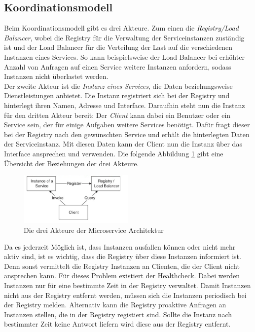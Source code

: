 \subsection{Koordinationsmodell}

Beim Koordinationsmodell gibt es drei Akteure. Zum einen die \textit{Registry/Load Balancer}, wobei die Registry für die Verwaltung der Serviceinstanzen zuständig ist und der Load Balancer für die Verteilung der Last auf die verschiedenen Instanzen eines Services. So kann beispielsweise der Load Balancer bei erhöhter Anzahl von Anfragen auf einen Service weitere Instanzen anfordern, sodass Instanzen nicht überlastet werden.\\
Der zweite Akteur ist die \textit{Instanz eines Services}, die Daten beziehungsweise Dienstleistungen anbietet. Die Instanz registriert sich bei der Registry und hinterlegt ihren Namen, Adresse und Interface. Daraufhin steht nun die Instanz für den dritten Akteur bereit: Der \textit{Client} kann dabei ein Benutzer oder ein Service sein, der für einige Aufgaben weitere Services benötigt. Dafür fragt dieser bei der Registry nach den gewünschten Service und erhält die hinterlegten Daten der Serviceinstanz. Mit diesen Daten kann der Client nun die Instanz über das Interface ansprechen und verwenden. Die folgende Abbildung \ref{bService} gibt eine Übersicht der Beziehungen der drei Akteure.

\begin{figure}[htbp]
  \centering
  \includegraphics[width=0.5\textwidth]{pictures/3akteure.png}
	\caption{Die drei Akteure der Microservice Architektur}
	\label{bService}
\end{figure}

Da es jederzeit Möglich ist, dass Instanzen ausfallen können oder nicht mehr aktiv sind, ist es wichtig, dass die Registry über diese Instanzen informiert ist. Denn sonst vermittelt die Registry Instanzen an Clienten, die der Client nicht ansprechen kann. Für dieses Problem existiert der Healthcheck. Dabei werden Instanzen nur für eine bestimmte Zeit in der Registry verwaltet. Damit Instanzen nicht aus der Registry entfernt werden, müssen sich die Instanzen periodisch bei der Registry melden. Alternativ kann die Registry proaktive Anfragen an Instanzen stellen, die in der Registry registiert sind. Sollte die Instanz nach bestimmter Zeit keine Antwort liefern wird diese aus der Registry entfernt.


